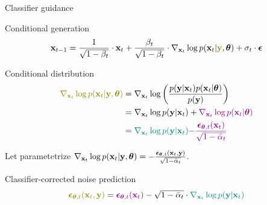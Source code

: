 \begin{frame}{Classifier guidance}
	\begin{block}{Conditional generation}
		\vspace{-0.5cm}
		\[
			\bx_{t - 1} = \frac{1}{\sqrt{1 - \beta_t}}\cdot \bx_t +  \frac{\beta_t}{\sqrt{1 - \beta_t}}  \cdot  \nabla_{\bx_t} \log p(\bx_t | {\color{olive}\by}, \btheta) +  \sigma_t \cdot \bepsilon
		\]
		\vspace{-0.5cm}
	\end{block}
	\begin{block}{Conditional distribution}
		\vspace{-0.7cm}
		\begin{align*}
			{\color{olive}\nabla_{\bx_t} \log p(\bx_t | \by, \btheta)} &= \nabla_{\bx_t} \log \left(\frac{p(\by | \bx_t)p(\bx_t | \btheta)}{p(\by)} \right)\\
			&= \nabla_{\bx_t} \log p(\by | \bx_t) + {\color{violet}\nabla_{\bx_t} \log p(\bx_t | \btheta)}\\
			&= {\color{teal}\nabla_{\bx_t} \log p(\by | \bx_t)} {\color{violet}- \frac{\bepsilon_{\btheta, t}(\bx_t)}{\sqrt{1 - \bar{\alpha}_t}}}
		\end{align*}
		\vspace{-0.5cm}
	\end{block}
	Let parametetrize $\nabla_{\mathbf{x}_t} \log p(\mathbf{x}_t | \mathbf{y}, \boldsymbol{\theta}) = - \frac{\boldsymbol{\epsilon}_{\boldsymbol{\theta}, t}(\mathbf{x}_t, \mathbf{y})}{\sqrt{1 - \bar{\alpha}_t}}$.
	\begin{block}{Classifier-corrected noise prediction}
		\vspace{-0.3cm}
		\[
			{\color{olive}\bepsilon_{\btheta, t}(\bx_t, \by)} = {\color{violet}\bepsilon_{\btheta, t}(\bx_t)} - \sqrt{1 - \bar{\alpha}_t} \cdot {\color{teal}\nabla_{\bx_t} \log p(\by | \bx_t)}
		\]
	\end{block}
\end{frame}
